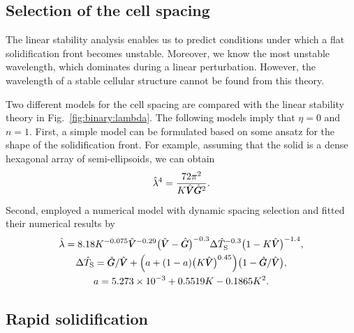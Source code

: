 \documentclass{article}
\newcommand{\sol}{\text{S}}
\newcommand{\hV}[1][\qty(\bar{V})]{\vphantom{#1}\mathrlap{\smash{\hat{V}}}V}
\newcommand{\hG}[1][\qty(\bar{G})]{\vphantom{#1}\mathrlap{\smash{\hat{G}}}G}
\begin{document}
\subsection{Selection of the cell spacing}

The linear stability analysis enables us to predict conditions
under which a flat solidification front becomes unstable.
Moreover, we know the most unstable wavelength, which dominates during a linear perturbation.
However, the wavelength of a stable cellular structure cannot be found from this theory.

Two different models for the cell spacing are compared with the linear stability theory
in Fig.~\ref{fig:binary:lambda}.
The following models imply that $\eta=0$ and $n=1$.
First, a simple model can be formulated based on some ansatz for the shape of the solidification front.
For example, assuming that the solid is a dense hexagonal array of semi-ellipsoids,
we can obtain~\cite{rappaz2009solidification}
\begin{equation}\label{eq:cell_spacing}
    \hat\lambda^4 = \frac{72\pi^2}{K\hV\hG^2}.
\end{equation}
Second, \textcite{hunt1996numerical} employed a numerical model with dynamic spacing selection
and fitted their numerical results by
\begin{equation}\label{eq:Hunt96}
    \begin{gathered}
        \hat\lambda = 8.18 K^{-0.075}\hV^{-0.29}\qty(\hV - \hG)^{-0.3}\Delta\hat{T}_\sol^{-0.3}\qty(1-K\hV)^{-1.4}, \\
        \Delta\hat{T}_\sol = \hG/\hV + \qty(a + (1-a)\qty(K\hV)^{0.45})\qty(1-\hG/\hV), \\
        a = \num{5.273e-3} + 0.5519K - 0.1865K^2.
    \end{gathered}
\end{equation}

\subsection{Rapid solidification}
\end{document}
